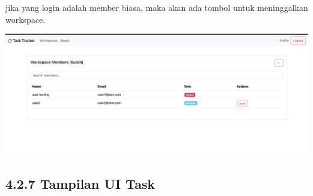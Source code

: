 jika yang login adalah member biasa, maka akan ada tombol untuk meninggalkan workspace.
\begin{center}
  \includegraphics[width=1\textwidth]{assets/ui/list_member_other_user.png}
\end{center}










\subsection*{4.2.7 Tampilan UI Task}
